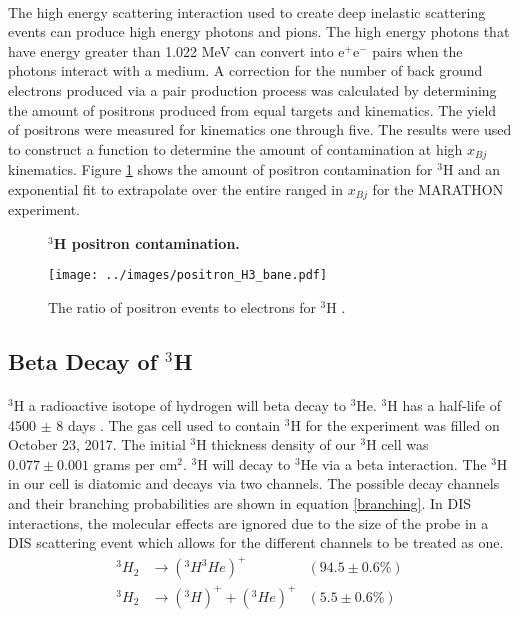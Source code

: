 \paragraph{} The high energy scattering interaction used to create deep inelastic scattering events can produce high energy photons and pions. The high energy photons that have energy greater than 1.022 MeV can convert into e$^+$e$^-$ pairs when the photons interact with a medium. A correction for the number of back ground electrons produced via a pair production process was calculated by determining the amount of positrons produced from equal targets and kinematics. The yield of positrons were measured for kinematics one through five. The results were used to construct a function to determine the amount of contamination at high $x_{Bj}$ kinematics. Figure \ref{PC} shows the amount of positron contamination for $^3$H and an exponential fit to extrapolate over the entire ranged in $x_{Bj}$ for the MARATHON experiment. 

\begin{figure}[t]
	\centering
	\textbf{$^3$H positron contamination. }\par\medskip
	\texttt{[image: ../images/positron\_H3\_bane.pdf]}
	\caption{The ratio of positron events to electrons for $^3$H \cite{tongsu}. }
	\label{PC}
\end{figure}

\subsection{Beta Decay of $^3$H}
\paragraph{} $^3$H a radioactive isotope of hydrogen will beta decay to $^3$He. $^3$H has a half-life of 4500 $\pm$ 8 days \cite{T2HL}. The gas cell used to contain $^3$H for the experiment was filled on October 23, 2017. The initial $^3$H thickness density of our $^3$H cell was $0.077 \pm 0.001 $ grams per cm$^2$. $^3$H will decay to $^3$He via a beta interaction. The $^3$H in our cell is diatomic and decays via two channels\cite{diaT}. The possible decay channels and their branching probabilities are shown in equation \ref{branching}. In DIS interactions, the molecular effects are ignored due to the size of the probe in a DIS scattering event which allows for the different channels to be treated as one. 
\begin{align}
			^3H_2 &\rightarrow(^3H ^3He)^+  &(94.5 \pm 0.6\%) \nonumber \\ 
			^3H_2 &\rightarrow(^3H)^+ + (^3He)^+  & (5.5 \pm 0.6\%) 
			\label{branching}
\end{align}
